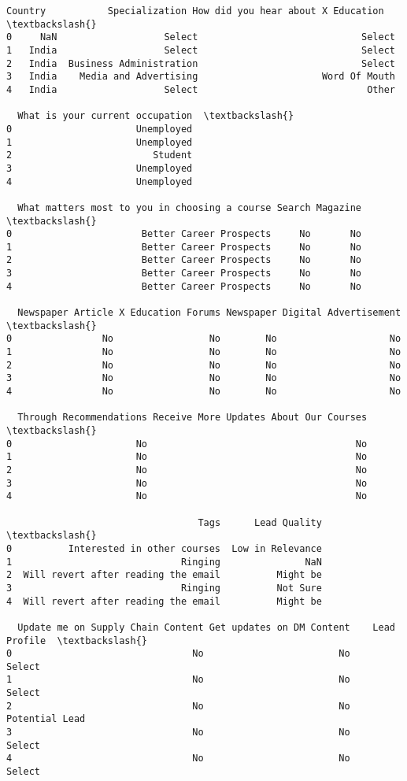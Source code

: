 \documentclass[11pt]{article}
\begin{document}
\begin{tcolorbox}[breakable, size=fbox, boxrule=.5pt, pad at break*=1mm, opacityfill=0]
\begin{Verbatim}[commandchars=\\\{\}]
  Country           Specialization How did you hear about X Education  \textbackslash{}
0     NaN                   Select                             Select
1   India                   Select                             Select
2   India  Business Administration                             Select
3   India    Media and Advertising                      Word Of Mouth
4   India                   Select                              Other

  What is your current occupation  \textbackslash{}
0                      Unemployed
1                      Unemployed
2                         Student
3                      Unemployed
4                      Unemployed

  What matters most to you in choosing a course Search Magazine  \textbackslash{}
0                       Better Career Prospects     No       No
1                       Better Career Prospects     No       No
2                       Better Career Prospects     No       No
3                       Better Career Prospects     No       No
4                       Better Career Prospects     No       No

  Newspaper Article X Education Forums Newspaper Digital Advertisement  \textbackslash{}
0                No                 No        No                    No
1                No                 No        No                    No
2                No                 No        No                    No
3                No                 No        No                    No
4                No                 No        No                    No

  Through Recommendations Receive More Updates About Our Courses  \textbackslash{}
0                      No                                     No
1                      No                                     No
2                      No                                     No
3                      No                                     No
4                      No                                     No

                                  Tags      Lead Quality  \textbackslash{}
0          Interested in other courses  Low in Relevance
1                              Ringing               NaN
2  Will revert after reading the email          Might be
3                              Ringing          Not Sure
4  Will revert after reading the email          Might be

  Update me on Supply Chain Content Get updates on DM Content    Lead Profile  \textbackslash{}
0                                No                        No          Select
1                                No                        No          Select
2                                No                        No  Potential Lead
3                                No                        No          Select
4                                No                        No          Select


\end{Verbatim}
\end{tcolorbox}
\end{document}
